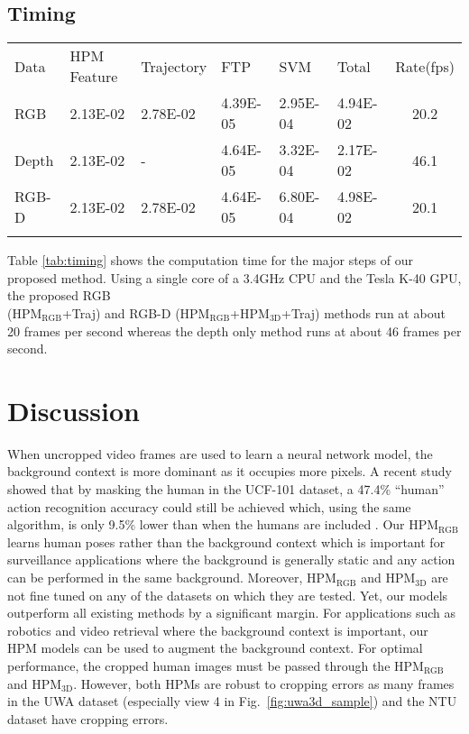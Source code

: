 \documentclass[twocolumn]{svjour3}          \smartqed  \usepackage{graphicx}
\begin{document}
\subsection{Timing}

\begin{table*}
\begin{center}
\caption{Execution time in seconds for the proposed method}
\label{tab:timing}
\begin{tabular}{llllllc}
\hline\noalign{\smallskip}
Data & \multicolumn{1}{l}{HPM Feature} & Trajectory & \multicolumn{1}{l}{FTP} & \multicolumn{1}{l}{SVM} & \multicolumn{1}{l}{Total} & \multicolumn{1}{l}{Rate(fps)} \\
\noalign{\smallskip}\hline\noalign{\smallskip}
RGB & 2.13E-02 & \multicolumn{1}{l}{2.78E-02} & 4.39E-05 & 2.95E-04 & 4.94E-02 & 20.2 \\
Depth & 2.13E-02 & - & 4.64E-05 & 3.32E-04 & 2.17E-02 & 46.1 \\
RGB-D & 2.13E-02 & \multicolumn{1}{l}{2.78E-02} & 4.64E-05 & 6.80E-04 & 4.98E-02 & 20.1 \\
\hline\noalign{\smallskip}
\end{tabular}
\end{center}
\end{table*}


Table \ref{tab:timing} shows the computation time for the major steps of our proposed method. Using a single core of a 3.4GHz CPU and the Tesla K-40 GPU, the proposed RGB \\ (HPM$_{\mathrm{RGB}}$+Traj) and RGB-D (HPM$_{\mathrm{RGB}}$+HPM$_{\mathrm{3D}}$+Traj) methods run at about 20 frames per second whereas the depth only method runs at about 46 frames per second. 

\section{Discussion}
\label{sec:disc}

When uncropped video frames are used to learn a neural network model, the background context is more dominant as it occupies more pixels. A recent study showed that by masking the human in the UCF-101 dataset, a 47.4\% ``human'' action recognition accuracy could still be achieved which, using the same algorithm, is only 9.5\% lower than when the humans are included \citep{he2016human}. Our HPM$_{\mathrm{RGB}}$ learns human poses rather than the background context which is important for surveillance applications where the background is generally static and any action can be performed in the same background. Moreover, HPM$_{\mathrm{RGB}}$ and HPM$_{\mathrm{3D}}$ are not fine tuned on any of the datasets on which they are tested. Yet, our models outperform all existing methods by a significant margin. For applications such as robotics and video retrieval where the background context is important, our HPM models can be used to augment the background context. For optimal performance, the cropped human images must be passed through the HPM$_{\mathrm{RGB}}$ and HPM$_{\mathrm{3D}}$. However, both HPMs are robust to cropping errors as many frames in the UWA dataset (especially view 4 in Fig.~\ref{fig:uwa3d_sample}) and the NTU dataset have cropping errors.
\end{document}
